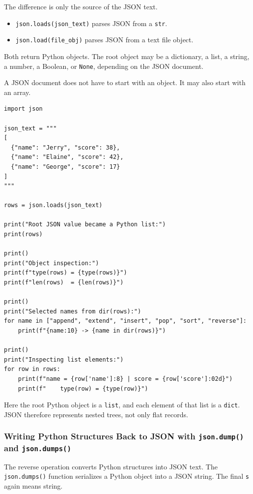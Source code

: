 The difference is only the source of the JSON text.

\begin{itemize}
    \item \texttt{json.loads(json\_text)} parses JSON from a \texttt{str}.
    \item \texttt{json.load(file\_obj)} parses JSON from a text file object.
\end{itemize}

Both return Python objects. The root object may be a dictionary, a list, a string, a number, a Boolean, or \texttt{None}, depending on the JSON document.

A JSON document does not have to start with an object. It may also start with an array.

\begin{verbatim}
import json

json_text = """
[
  {"name": "Jerry", "score": 38},
  {"name": "Elaine", "score": 42},
  {"name": "George", "score": 17}
]
"""

rows = json.loads(json_text)

print("Root JSON value became a Python list:")
print(rows)

print()
print("Object inspection:")
print(f"type(rows) = {type(rows)}")
print(f"len(rows)  = {len(rows)}")

print()
print("Selected names from dir(rows):")
for name in ["append", "extend", "insert", "pop", "sort", "reverse"]:
    print(f"{name:10} -> {name in dir(rows)}")

print()
print("Inspecting list elements:")
for row in rows:
    print(f"name = {row['name']:8} | score = {row['score']:02d}")
    print(f"    type(row) = {type(row)}")
\end{verbatim}

Here the root Python object is a \texttt{list}, and each element of that list is a \texttt{dict}. JSON therefore represents nested trees, not only flat records.

\subsubsection{Writing Python Structures Back to JSON with \texttt{json.dump()} and \texttt{json.dumps()}}

The reverse operation converts Python structures into JSON text. The \texttt{json.dumps()} function serializes a Python object into a JSON string. The final \texttt{s} again means string.

